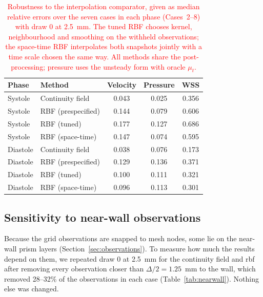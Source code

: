 \documentclass[12pt,a4paper]{article}
\newcommand{\RBF}{\ac{rbf}\xspace}
\theoremstyle{definition}
\numberwithin{equation}{section}
\begin{document}
\begin{table}[htbp]
\centering
\small
\caption{\textcolor{red}{Robustness to the interpolation comparator, given as median relative errors over the seven cases in each phase (Cases~2--8) with draw 0 at 2.5~mm. The tuned RBF chooses kernel, neighbourhood and smoothing on the withheld observations; the space-time RBF interpolates both snapshots jointly with a time scale chosen the same way. All methods share the post-processing; pressure uses the unsteady form with oracle $\mu_t$.}}
\label{tab:robustness}
\begin{tabular}{llccc}
\toprule
Phase & Method & Velocity & Pressure & WSS \\
\midrule
Systole & Continuity field & 0.043 & 0.025 & 0.356 \\
Systole & RBF (prespecified) & 0.144 & 0.079 & 0.606 \\
Systole & RBF (tuned) & 0.177 & 0.127 & 0.686 \\
Systole & RBF (space-time) & 0.147 & 0.074 & 0.595 \\
Diastole & Continuity field & 0.038 & 0.076 & 0.173 \\
Diastole & RBF (prespecified) & 0.129 & 0.136 & 0.371 \\
Diastole & RBF (tuned) & 0.100 & 0.111 & 0.321 \\
Diastole & RBF (space-time) & 0.096 & 0.113 & 0.301 \\
\bottomrule
\end{tabular}
\end{table}



\subsection{Sensitivity to near-wall observations}
\label{sec:nearwall}
Because the grid observations are snapped to mesh nodes, some lie on the near-wall prism layers (Section~\ref{sec:observations}). To measure how much the results depend on them, we repeated draw 0 at 2.5~mm for the continuity field and \RBF after removing every observation closer than $\Delta/2=1.25$~mm to the wall, which removed 28--32\% of the observations in each case (Table~\ref{tab:nearwall}). Nothing else was changed.
\end{document}
